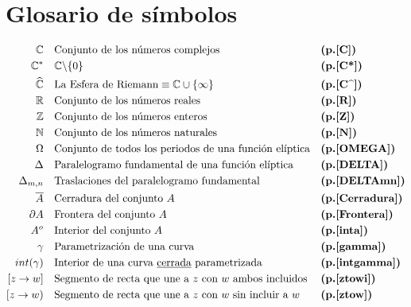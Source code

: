 \documentclass[spanish, openright,oneside]{book}
\theoremstyle{definition}
\begin{document}
\chapter*{Glosario de símbolos}
\begin{align*}
\mathbb{C}\ \ \ &  \text{Conjunto de los números complejos}  & & \text{\textbf{(p.\pageref{C})}}\\
\mathbb{C^*}\ \ \ &  \mathbb{C}\backslash\{0\} & & \text{\textbf{(p.\pageref{C*})}}\\
\widehat{\mathbb{C}}\ \ \ &\text{La Esfera de Riemann} \equiv\mathbb{C} \cup\{\infty\} & & \text{\textbf{(p.\pageref{C^})}}\\
\mathbb{R}\ \ \ & \text{Conjunto de los números reales}   &  & \text{\textbf{(p.\pageref{R})}}\\
\mathbb{Z}\ \ \ & \text{Conjunto de los números enteros}   & & \text{\textbf{(p.\pageref{Z})}}\\
\mathbb{N}\ \ \ & \text{Conjunto de los números naturales}   & & \text{\textbf{(p.\pageref{N})}}\\
\Omega\ \ \ & \text{Conjunto de todos los periodos de una función elíptica}   & & \text{\textbf{(p.\pageref{OMEGA})}}\\
\Delta\ \ \ & \text{Paralelogramo fundamental de una función elíptica}   & & \text{\textbf{(p.\pageref{DELTA})}}\\
\Delta_{m,n}\ \ \ & \text{Traslaciones del paralelogramo fundamental}   & & \text{\textbf{(p.\pageref{DELTAmn})}}\\
\overline{A}\ \ \ & \text{Cerradura del conjunto $A$}   & & \text{\textbf{(p.\pageref{Cerradura})}}\\
\partial A\ \ \ & \text{Frontera del conjunto $A$}   & & \text{\textbf{(p.\pageref{Frontera})}}\\
 A^{o}\ \ \ & \text{Interior del conjunto $A$}   & & \text{\textbf{(p.\pageref{inta})}}\\
\gamma\ \ \ & \text{Parametrización de una curva}   & & \text{\textbf{(p.\pageref{gamma})}}\\
int(\gamma)\ \ \ & \text{Interior de una curva \underline{cerrada} parametrizada}   & & \text{\textbf{(p.\pageref{intgamma})}}\\
[z \rightarrow w]\ \ \ & \text{Segmento de recta que une a $z$ con $w$ ambos incluidos}   & & \text{\textbf{(p.\pageref{ztowi})}}\\
[z \rightarrow w)\ \ \ & \text{Segmento de recta que une a $z$ con $w$ sin incluir a $w$}   & & \text{\textbf{(p.\pageref{ztow})}}\\

\end{align*}
\end{document}

